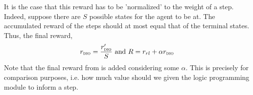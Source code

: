It is the case that this reward has to be 'normalized' to the weight of a step. Indeed, suppose there are $S$ possible states for the agent to be at. 
The accumulated reward of the steps should at most equal that of the terminal states. Thus, the final reward, 
\[
  r_{\textsc{dio}{}} = \dfrac{r'_{\textsc{dio}{}}}{S} \text{    and    }
  R = r_{rl} + \alpha r_{\textsc{dio}{}}
\] 
Note that the final reward from \dio{} is added considering some $\alpha$. This is precisely for comparison purposes, i.e. how much value should we given the logic programming module 
to inform a step. 

